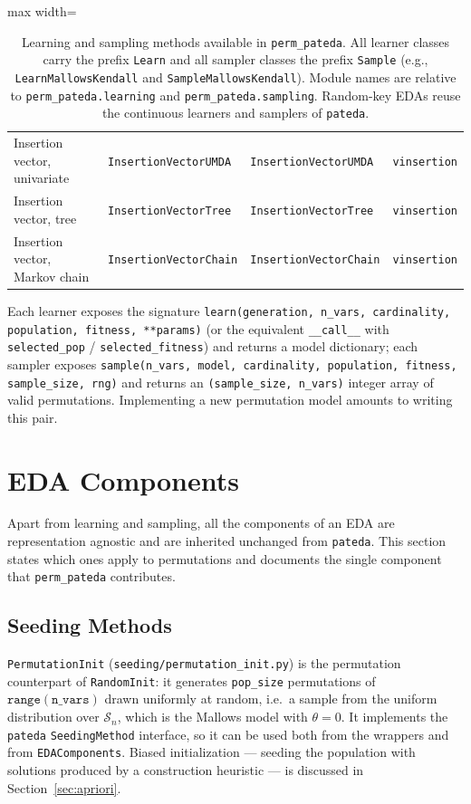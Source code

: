 \documentclass[a4paper,11pt]{article}
\begin{document}
\begin{table}[ht]
\begin{adjustbox}{max width=\textwidth}
\begin{tabular}{llll}
Insertion vector, univariate & \texttt{InsertionVectorUMDA} & \texttt{InsertionVectorUMDA} & \texttt{vinsertion} \\
Insertion vector, tree & \texttt{InsertionVectorTree} & \texttt{InsertionVectorTree} & \texttt{vinsertion} \\
Insertion vector, Markov chain & \texttt{InsertionVectorChain} & \texttt{InsertionVectorChain} & \texttt{vinsertion} \\
\bottomrule
\end{tabular}
\end{adjustbox}
\caption{Learning and sampling methods available in \texttt{perm\_pateda}.
All learner classes carry the prefix \texttt{Learn} and all sampler classes
the prefix \texttt{Sample} (e.g., \texttt{LearnMallowsKendall} and
\texttt{SampleMallowsKendall}).
Module names are relative to \texttt{perm\_pateda.learning} and
\texttt{perm\_pateda.sampling}.  Random-key EDAs reuse the continuous learners
and samplers of \texttt{pateda}.}
\label{tab:models}
\end{table}

Each learner exposes the signature
\texttt{learn(generation, n\_vars, cardinality, population, fitness, **params)}
(or the equivalent \texttt{\_\_call\_\_} with \texttt{selected\_pop} /
\texttt{selected\_fitness}) and returns a model dictionary; each sampler exposes
\texttt{sample(n\_vars, model, cardinality, population, fitness, sample\_size,
rng)} and returns an \texttt{(sample\_size, n\_vars)} integer array of valid
permutations.  Implementing a new permutation model amounts to writing this pair.

\section{EDA Components}
\label{sec:components}

Apart from learning and sampling, all the components of an EDA are
representation agnostic and are inherited unchanged from \texttt{pateda}.  This
section states which ones apply to permutations and documents the single
component that \texttt{perm\_pateda} contributes.

\subsection{Seeding Methods}

\texttt{PermutationInit} (\texttt{seeding/permutation\_init.py}) is the
permutation counterpart of \texttt{RandomInit}: it generates \texttt{pop\_size}
permutations of $\mathtt{range(n\_vars)}$ drawn uniformly at random, i.e.\ a
sample from the uniform distribution over $\mathcal{S}_n$, which is the Mallows
model with $\theta = 0$.  It implements the \texttt{pateda}
\texttt{SeedingMethod} interface, so it can be used both from the wrappers and
from \texttt{EDAComponents}.  Biased initialization --- seeding the population
with solutions produced by a construction heuristic --- is discussed in
Section~\ref{sec:apriori}.
\end{document}
